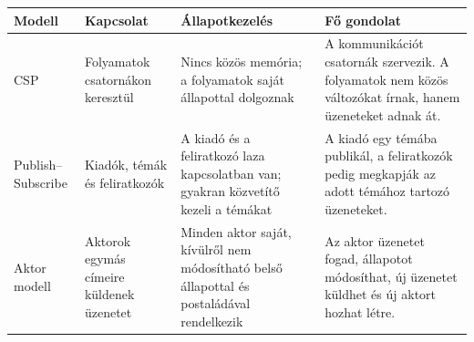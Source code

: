 \begin{tabularx}{\textwidth}{L{28mm}L{31mm}L{35mm}X}
\toprule
\textbf{Modell} & \textbf{Kapcsolat} & \textbf{Állapotkezelés} & \textbf{Fő gondolat} \\
\midrule
CSP & Folyamatok csatornákon keresztül & Nincs közös memória; a folyamatok saját állapottal dolgoznak & A kommunikációt csatornák szervezik. A folyamatok nem közös változókat írnak, hanem üzeneteket adnak át. \\
Publish--Subscribe & Kiadók, témák és feliratkozók & A kiadó és a feliratkozó laza kapcsolatban van; gyakran közvetítő kezeli a témákat & A kiadó egy témába publikál, a feliratkozók pedig megkapják az adott témához tartozó üzeneteket. \\
Aktor modell & Aktorok egymás címeire küldenek üzenetet & Minden aktor saját, kívülről nem módosítható belső állapottal és postaládával rendelkezik & Az aktor üzenetet fogad, állapotot módosíthat, új üzenetet küldhet és új aktort hozhat létre. \\
\bottomrule
\end{tabularx}
